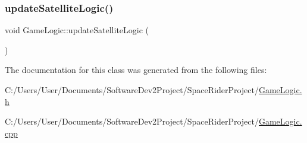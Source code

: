 \subsubsection{\texorpdfstring{update\+Satellite\+Logic()}{updateSatelliteLogic()}}
{\footnotesize\ttfamily void Game\+Logic\+::update\+Satellite\+Logic (\begin{DoxyParamCaption}{ }\end{DoxyParamCaption})}



The documentation for this class was generated from the following files\+:\begin{DoxyCompactItemize}
\item 
C\+:/\+Users/\+User/\+Documents/\+Software\+Dev2\+Project/\+Space\+Rider\+Project/\hyperlink{_game_logic_8h}{Game\+Logic.\+h}\item 
C\+:/\+Users/\+User/\+Documents/\+Software\+Dev2\+Project/\+Space\+Rider\+Project/\hyperlink{_game_logic_8cpp}{Game\+Logic.\+cpp}\end{DoxyCompactItemize}
